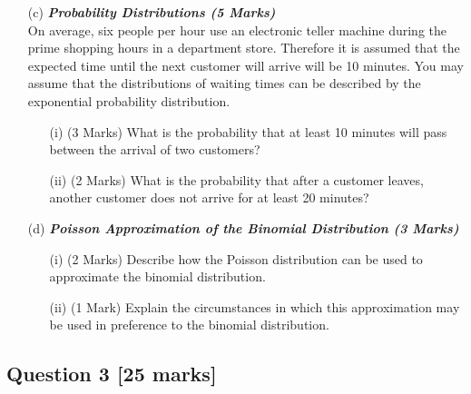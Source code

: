 \documentclass[a4paper,12pt]{article}
\begin{document}
\begin{itemize}



\item[(c)] \textbf{\textit{Probability Distributions (5 Marks)}}\\ On average, six people per hour use an electronic teller machine during the prime shopping hours in a department store. Therefore it is assumed that the expected time until the next customer will arrive will be 10 minutes. You may assume that the distributions of waiting times can be described by the exponential probability distribution.

\begin{itemize}
\item[(i)] (3 Marks) What is the probability that at least 10 minutes will pass between the arrival of two customers?
\item[(ii)] (2 Marks) What is the probability that after a customer leaves, another customer does not arrive for at least 20 minutes?
\end{itemize}
\item[(d)] \textbf{\textit{Poisson Approximation of the Binomial Distribution (3 Marks)}}
\begin{itemize}
\item[(i)] (2 Marks) Describe how the Poisson distribution can be used to approximate the binomial distribution.
\item[(ii)] (1 Mark) Explain the circumstances in which this approximation may be used in preference to the binomial distribution.
\end{itemize}
\end{itemize}




\newpage

\subsection*{Question 3 [25 marks]}
\end{document}
